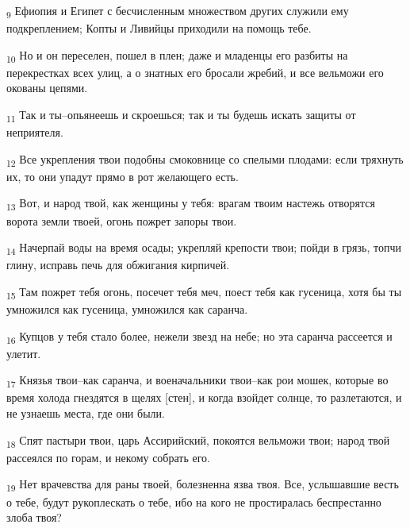 \begin{tcolorbox}
\textsubscript{9} Ефиопия и Египет с бесчисленным множеством других служили ему подкреплением; Копты и Ливийцы приходили на помощь тебе.
\end{tcolorbox}
\begin{tcolorbox}
\textsubscript{10} Но и он переселен, пошел в плен; даже и младенцы его разбиты на перекрестках всех улиц, а о знатных его бросали жребий, и все вельможи его окованы цепями.
\end{tcolorbox}
\begin{tcolorbox}
\textsubscript{11} Так и ты--опьянеешь и скроешься; так и ты будешь искать защиты от неприятеля.
\end{tcolorbox}
\begin{tcolorbox}
\textsubscript{12} Все укрепления твои подобны смоковнице со спелыми плодами: если тряхнуть их, то они упадут прямо в рот желающего есть.
\end{tcolorbox}
\begin{tcolorbox}
\textsubscript{13} Вот, и народ твой, как женщины у тебя: врагам твоим настежь отворятся ворота земли твоей, огонь пожрет запоры твои.
\end{tcolorbox}
\begin{tcolorbox}
\textsubscript{14} Начерпай воды на время осады; укрепляй крепости твои; пойди в грязь, топчи глину, исправь печь для обжигания кирпичей.
\end{tcolorbox}
\begin{tcolorbox}
\textsubscript{15} Там пожрет тебя огонь, посечет тебя меч, поест тебя как гусеница, хотя бы ты умножился как гусеница, умножился как саранча.
\end{tcolorbox}
\begin{tcolorbox}
\textsubscript{16} Купцов у тебя стало более, нежели звезд на небе; но эта саранча рассеется и улетит.
\end{tcolorbox}
\begin{tcolorbox}
\textsubscript{17} Князья твои--как саранча, и военачальники твои--как рои мошек, которые во время холода гнездятся в щелях [стен], и когда взойдет солнце, то разлетаются, и не узнаешь места, где они были.
\end{tcolorbox}
\begin{tcolorbox}
\textsubscript{18} Спят пастыри твои, царь Ассирийский, покоятся вельможи твои; народ твой рассеялся по горам, и некому собрать его.
\end{tcolorbox}
\begin{tcolorbox}
\textsubscript{19} Нет врачевства для раны твоей, болезненна язва твоя. Все, услышавшие весть о тебе, будут рукоплескать о тебе, ибо на кого не простиралась беспрестанно злоба твоя?
\end{tcolorbox}
